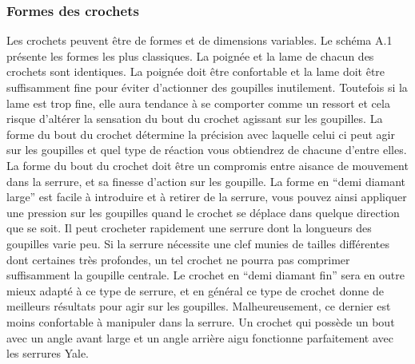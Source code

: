 \documentclass[a4paper,french,11pt,twoside]{report}
\begin{document}
\subsubsection{Formes des crochets}
Les crochets peuvent être de formes et de dimensions variables. Le schéma A.1 présente les formes les plus classiques. La poignée et la lame de chacun des crochets sont identiques. La poignée doit être confortable et la lame doit être suffisamment fine pour éviter d'actionner des goupilles inutilement. Toutefois si la lame est trop fine, elle aura tendance à se comporter comme un ressort et cela risque d'altérer la sensation du bout du crochet agissant sur les goupilles. La forme du bout du crochet détermine la précision avec laquelle celui ci peut agir sur les goupilles et quel type de réaction vous obtiendrez de chacune d'entre elles.
La forme du bout du crochet doit être un compromis entre aisance de mouvement dans la serrure, et sa finesse d'action sur les goupille. La forme en \enquote{demi diamant large} est facile à introduire et à retirer de la serrure, vous pouvez ainsi appliquer une pression sur les goupilles quand le crochet se déplace dans quelque direction que se soit. Il peut crocheter rapidement une serrure dont la longueurs des goupilles varie peu. Si la serrure nécessite une clef munies de tailles différentes dont certaines très profondes, un tel crochet ne pourra pas comprimer suffisamment la goupille centrale. Le crochet en \enquote{demi diamant fin} sera en outre mieux adapté à ce type de serrure, et en général ce type de crochet donne de meilleurs résultats pour agir sur les goupilles. Malheureusement, ce dernier est moins confortable à manipuler dans la serrure. Un crochet qui possède un bout avec un angle avant large et un angle arrière aigu fonctionne parfaitement avec les serrures Yale.
\end{document}
